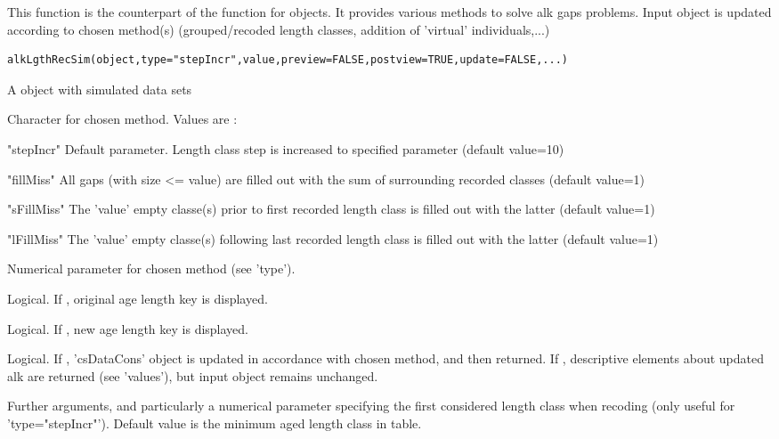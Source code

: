 \begin{Description}\relax
This function is the counterpart of the  function 
for  objects. It provides various methods to solve alk gaps problems. 
Input object is updated according to chosen method(s) (grouped/recoded length classes, addition of 'virtual' individuals,...)
\end{Description}
\begin{Usage}
\begin{verbatim}
alkLgthRecSim(object,type="stepIncr",value,preview=FALSE,postview=TRUE,update=FALSE,...)
\end{verbatim}
\end{Usage}
\begin{Arguments}
\begin{ldescription}
\item[\code{object}] A  object with simulated data sets
\item[\code{type}] Character for chosen method. Values are :
\item["stepIncr"] Default parameter. Length class step is increased to specified  parameter (default value=10)
\item["fillMiss"] All gaps (with size <= value) are filled out with the sum of surrounding recorded classes (default value=1)
\item["sFillMiss"] The 'value' empty classe(s) prior to first recorded length class is filled out with the latter (default value=1)
\item["lFillMiss"] The 'value' empty classe(s) following last recorded length class is filled out with the latter (default value=1) 

\item[\code{value}] Numerical parameter for chosen method (see 'type').
\item[\code{preview}] Logical. If , original age length key is displayed.
\item[\code{postview}] Logical. If , new age length key is displayed.
\item[\code{update}] Logical. If , 'csDataCons' object is updated in accordance with chosen method, and then returned. 
If , descriptive elements about updated alk are returned (see 'values'), but input object remains unchanged.
\item[\code{...}] Further arguments, and particularly a  numerical parameter specifying the first considered length class when recoding (only useful for 'type="stepIncr"'). 
Default value is the minimum aged length class in  table.
\end{ldescription}
\end{Arguments}
